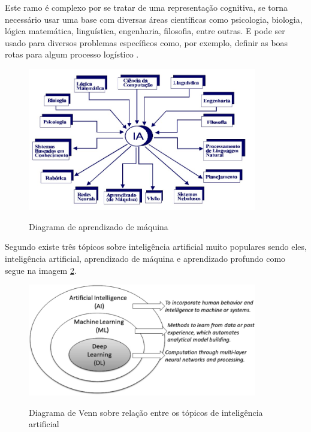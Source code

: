\documentclass[
	12pt,				%
	openright,			%
	twoside,			%
	a4paper,			%
	english,			%
	french,				%
	spanish,			%
	brazil				%
	]{abntex2}
\begin{document}
Este ramo é complexo por se tratar de uma representação cognitiva, se torna necessário usar uma base com diversas áreas científicas como psicologia, biologia, lógica matemática, linguística, engenharia, filosofia, entre outras. E pode ser usado para diversos problemas específicos como, por exemplo, definir as boas rotas para algum processo logístico \space\cite{ia_conceitos_aplicacoes}.

\begin{figure}[H]
	\caption{Diagrama de aprendizado de máquina}
	\centering %
	\includegraphics[width=10cm]{figures/areas_ia.jpg} %
	\label{fig:areas_ia}
\end{figure}

Segundo  existe três tópicos sobre inteligência artificial muito populares sendo eles, inteligência artificial, aprendizado de máquina e aprendizado profundo como segue na imagem \cref{fig:diagrama_ia_ml_dp}.

\begin{figure}[H]
	\caption{Diagrama de Venn sobre relação entre os tópicos de inteligência artificial}
	\centering %
	\includegraphics[width=10cm]{figures/diagrama_ia_ml_dp.png} %
	\label{fig:diagrama_ia_ml_dp}
\end{figure}
\end{document}
